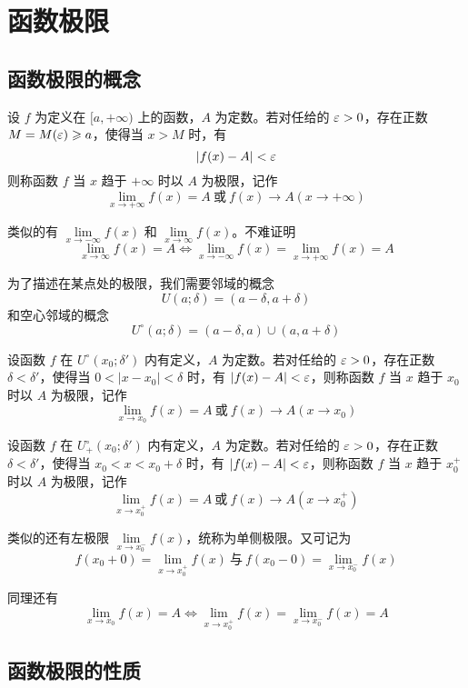 \chapter{函数极限}

\section{函数极限的概念}

\begin{definition}
	设 $f$ 为定义在 $[a,+\infty)$ 上的函数，$A$ 为定数。若对任给的 $\varepsilon>0$，存在正数 $M=M(\varepsilon) \geqslant a$，使得当 $x>M$ 时，有
	\[ |f(x)-A| < \varepsilon \]
	则称函数 $f$ 当 $x$ 趋于 $+\infty$ 时以 $A$ 为极限，记作
	\[ \lim_{x \to +\infty}f(x) = A\ \text{或}\ f(x) \to A(x \to +\infty) \]
\end{definition}

类似的有 $\lim\limits_{x \to -\infty}f(x)$ 和 $\lim\limits_{x \to \infty}f(x)$。不难证明
\[ \lim_{x \to \infty}f(x) = A \Leftrightarrow \lim_{x \to -\infty}f(x)=\lim_{x \to +\infty}f(x)=A \]

为了描述在某点处的极限，我们需要邻域的概念
\[ U(a;\delta) = (a-\delta,a+\delta) \]
和空心邻域的概念
\[ U^\circ (a;\delta) = (a-\delta,a) \cup (a, a+\delta) \]

\begin{definition}
	设函数 $f$ 在 $U^\circ(x_0;\delta')$ 内有定义，$A$ 为定数。若对任给的 $\varepsilon>0$，存在正数 $\delta<\delta'$，使得当 $0<|x-x_0|<\delta$ 时，有 $|f(x)-A|<\varepsilon$，则称函数 $f$ 当 $x$ 趋于 $x_0$ 时以 $A$ 为极限，记作
	\[ \lim_{x \to x_0}f(x) = A\ \text{或}\ f(x)\to A(x \to x_0) \]
\end{definition}

\begin{definition}
	设函数 $f$ 在 $U_+^\circ(x_0;\delta')$ 内有定义，$A$ 为定数。若对任给的 $\varepsilon>0$，存在正数 $\delta<\delta'$，使得当 $x_0<x<x_0+\delta$ 时，有 $|f(x)-A|<\varepsilon$，则称函数 $f$ 当 $x$ 趋于 $x_0^+$ 时以 $A$ 为极限，记作
	\[ \lim_{x \to x_0^+}f(x) = A\ \text{或}\ f(x)\to A(x \to x_0^+) \]
\end{definition}

类似的还有左极限 $\lim\limits_{x \to x_0^-}f(x)$，统称为单侧极限。又可记为
\[ f(x_0+0) = \lim_{x \to x_0^+}f(x)\ \text{与}\ f(x_0-0) = \lim_{x \to x_0^-}f(x) \]

同理还有
\[ \lim_{x \to x_0}f(x) = A \Leftrightarrow \lim_{x \to x_0^+}f(x)=\lim_{x \to x_0^-}f(x)=A \]

\section{函数极限的性质}

